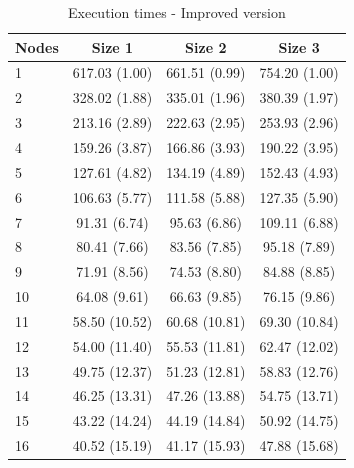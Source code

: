 \documentclass{article}
\begin{document}
\begin{table}[H]
\centering
\begin{tabular}{|l|c|c|c|}
\hline
Nodes & Size 1 & Size 2 & Size 3 \\ \hline
1 & 617.03 (1.00) & 661.51 (0.99) & 754.20 (1.00) \\ \hline
2 & 328.02 (1.88) & 335.01 (1.96) & 380.39 (1.97) \\ \hline
3 & 213.16 (2.89) & 222.63 (2.95) & 253.93 (2.96) \\ \hline
4 & 159.26 (3.87) & 166.86 (3.93) & 190.22 (3.95) \\ \hline
5 & 127.61 (4.82) & 134.19 (4.89) & 152.43 (4.93) \\ \hline
6 & 106.63 (5.77) & 111.58 (5.88) & 127.35 (5.90) \\ \hline
7 & 91.31 (6.74) & 95.63 (6.86) & 109.11 (6.88) \\ \hline
8 & 80.41 (7.66) & 83.56 (7.85) & 95.18 (7.89) \\ \hline
9 & 71.91 (8.56) & 74.53 (8.80) & 84.88 (8.85) \\ \hline
10 & 64.08 (9.61) & 66.63 (9.85) & 76.15 (9.86) \\ \hline
11 & 58.50 (10.52) & 60.68 (10.81) & 69.30 (10.84) \\ \hline
12 & 54.00 (11.40) & 55.53 (11.81) & 62.47 (12.02) \\ \hline
13 & 49.75 (12.37) & 51.23 (12.81) & 58.83 (12.76) \\ \hline
14 & 46.25 (13.31) & 47.26 (13.88) & 54.75 (13.71) \\ \hline
15 & 43.22 (14.24) & 44.19 (14.84) & 50.92 (14.75) \\ \hline
16 & 40.52 (15.19) & 41.17 (15.93) & 47.88 (15.68) \\ \hline
\end{tabular}
\caption{Execution times - Improved version} \label{tab:improvedtimes}
\end{table}
\end{document}
